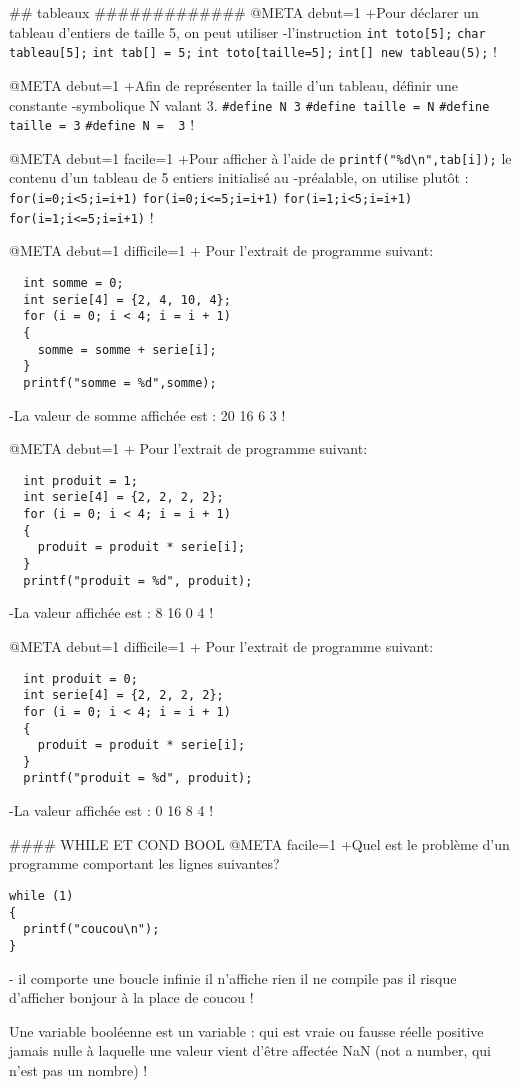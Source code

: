 ## tableaux #############
@META debut=1
+Pour déclarer un tableau d'entiers de taille 5, on peut utiliser
-l'instruction
 \verb|int toto[5];|
 \verb|char tableau[5];|
 \verb|int tab[] = 5;|
 \verb|int toto[taille=5];|
 \verb|int[] new tableau(5);|
!

@META debut=1
+Afin de représenter la taille d'un tableau, définir une constante
-symbolique N valant 3.
 \verb|#define N 3|
 \verb|#define taille = N|
 \verb|#define taille = 3|
 \verb|#define N =  3|
!

@META debut=1 facile=1
+Pour afficher à l'aide de \verb|printf("%d\n",tab[i]);| le contenu d'un tableau de 5 entiers initialisé au
-préalable, on utilise plutôt :
 \verb|for(i=0;i<5;i=i+1)|
 \verb|for(i=0;i<=5;i=i+1)|
 \verb|for(i=1;i<5;i=i+1)|
 \verb|for(i=1;i<=5;i=i+1)|
!

@META debut=1 difficile=1
+ Pour l'extrait de programme suivant: 
 \begin{verbatim} 
  int somme = 0;
  int serie[4] = {2, 4, 10, 4};
  for (i = 0; i < 4; i = i + 1) 
  {
    somme = somme + serie[i];
  }
  printf("somme = %d",somme); 
\end{verbatim}
-La valeur de somme affichée est : 
 20
 16
 6
 3
!

@META debut=1
+ Pour l'extrait de programme suivant: 
 \begin{verbatim} 
  int produit = 1;
  int serie[4] = {2, 2, 2, 2};
  for (i = 0; i < 4; i = i + 1) 
  {
    produit = produit * serie[i];
  }
  printf("produit = %d", produit); 
\end{verbatim}
-La valeur affichée est : 
 8
 16
 0
 4
!

@META debut=1 difficile=1
+ Pour l'extrait de programme suivant: 
 \begin{verbatim} 
  int produit = 0;
  int serie[4] = {2, 2, 2, 2};
  for (i = 0; i < 4; i = i + 1) 
  {
    produit = produit * serie[i];
  }
  printf("produit = %d", produit); 
\end{verbatim}
-La valeur affichée est : 
 0
 16
 8
 4
!


#### WHILE ET COND BOOL
@META facile=1
+Quel est le problème d'un programme comportant les lignes suivantes?
\begin{verbatim}
while (1)
{
  printf("coucou\n");
}
\end{verbatim}
-
  il comporte une boucle infinie
  il n'affiche rien
  il ne compile pas
  il risque d'afficher bonjour à la place de coucou
!

Une variable booléenne est un variable :
 qui est vraie ou fausse
 réelle positive
 jamais nulle
 à laquelle une valeur vient d'être affectée
 NaN (not a number, qui n'est pas un nombre)
! 


